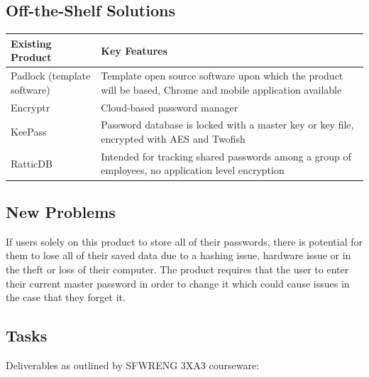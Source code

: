 \documentclass[12pt, titlepage]{article}
\begin{document}
\subsection{Off-the-Shelf Solutions}
\begin{table}
\begin{center}
\begin{tabular}{ | p{3cm} | p{10cm} | }
	\hline
	Existing Product & Key Features \\
	\hline
	Padlock (template software) \cite{PadLockGit} & Template open source software upon which the product will be based, Chrome and mobile application available \\
	\hline
	Encryptr \cite{EncryptrGit} & Cloud-based password manager \\
	\hline
	KeePass \cite{KeePassSite} & Password database is locked with a master key or key file, encrypted with AES and Twofish \\
	\hline
	RatticDB \cite{RatticDBSite} & Intended for tracking shared  passwords among a group of employees, no application level encryption \\
\hline
\end{tabular}
\end{center}
\end{table}


\subsection{New Problems}

If users solely on this product to store all of their passwords, there is potential for them to lose all of their saved data due to a hashing issue, hardware issue or in the theft or loss of their computer. The product requires that the user to enter their current master password in order to change it which could cause issues in the case that they forget it.

\subsection{Tasks}

Deliverables as outlined by SFWRENG 3XA3 courseware:
\end{document}
